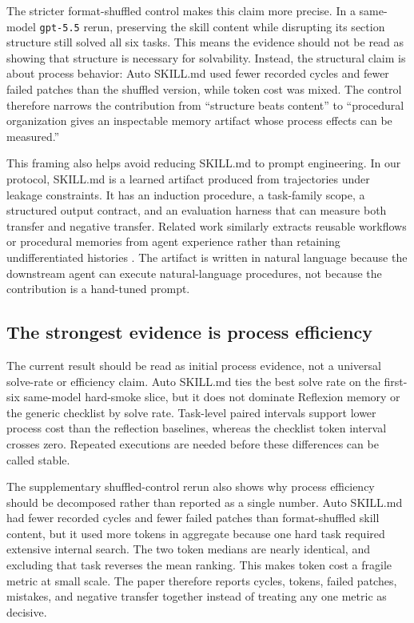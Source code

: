 The stricter format-shuffled control makes this claim more precise. In a same-model \texttt{gpt-5.5} rerun, preserving the skill content while disrupting its section structure still solved all six tasks. This means the evidence should not be read as showing that structure is necessary for solvability. Instead, the structural claim is about process behavior: Auto SKILL.md used fewer recorded cycles and fewer failed patches than the shuffled version, while token cost was mixed. The control therefore narrows the contribution from ``structure beats content'' to ``procedural organization gives an inspectable memory artifact whose process effects can be measured.''

This framing also helps avoid reducing SKILL.md to prompt engineering. In our protocol, SKILL.md is a learned artifact produced from trajectories under leakage constraints. It has an induction procedure, a task-family scope, a structured output contract, and an evaluation harness that can measure both transfer and negative transfer. Related work similarly extracts reusable workflows or procedural memories from agent experience rather than retaining undifferentiated histories \cite{wang2025workflowmemory,fang2026memp}. The artifact is written in natural language because the downstream agent can execute natural-language procedures, not because the contribution is a hand-tuned prompt.

\subsection{The strongest evidence is process efficiency}
\label{sec:discussion_efficiency}

The current result should be read as initial process evidence, not a universal solve-rate or efficiency claim. Auto SKILL.md ties the best solve rate on the first-six same-model hard-smoke slice, but it does not dominate Reflexion memory or the generic checklist by solve rate. Task-level paired intervals support lower process cost than the reflection baselines, whereas the checklist token interval crosses zero. Repeated executions are needed before these differences can be called stable.

The supplementary shuffled-control rerun also shows why process efficiency should be decomposed rather than reported as a single number. Auto SKILL.md had fewer recorded cycles and fewer failed patches than format-shuffled skill content, but it used more tokens in aggregate because one hard task required extensive internal search. The two token medians are nearly identical, and excluding that task reverses the mean ranking. This makes token cost a fragile metric at small scale. The paper therefore reports cycles, tokens, failed patches, mistakes, and negative transfer together instead of treating any one metric as decisive.

